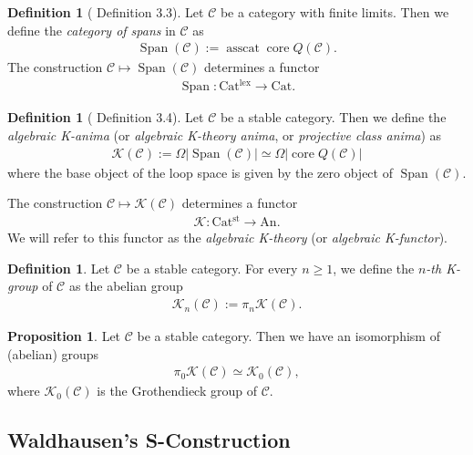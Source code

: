 \documentclass[a4paper,dvipdfmx,11pt,reqno]{amsart}
\newcommand{\C}{\mathcal{C}}
\newcommand{\K}{\mathcal{K}}
\DeclareMathOperator{\core}{core}
\DeclareMathOperator{\asscat}{asscat}
\DeclareMathOperator{\Span}{Span}
\newcommand{\An}{\mathrm{An}}
\newcommand{\Cat}{\mathrm{Cat}}
\newcommand{\Catlex}{\mathrm{Cat^{lex}}}
\newcommand{\Catst}{\mathrm{Cat^{st}}}
\theoremstyle{definition}
\newtheorem{definition}[theorem]{Definition}
\newtheorem{proposition}[theorem]{Proposition}
\begin{document}
\begin{definition}[\cite{HLS23} Definition 3.3] \label{HLS23.def.3.3}
  Let $\C$ be a category with finite limits.
  Then we define the \textit{category of spans} in $\C$ as 
  \begin{align*}
    \Span(\C) := \asscat \core Q(\C).
  \end{align*}
  The construction $\C \mapsto \Span(\C)$ determines a functor 
  \begin{align*}
    \Span : \Catlex \to \Cat.
  \end{align*}
\end{definition}

\begin{definition}[\cite{HLS23} Definition 3.4] \label{HLS23.def.3.4}
  Let $\C$ be a stable category.
  Then we define the \textit{algebraic K-anima} (or \textit{algebraic K-theory anima}, or \textit{projective class anima}) as 
  \begin{align*}
    \K(\C) := \Omega|\Span(\C)| \simeq \Omega|\core Q(\C)|
  \end{align*}
  where the base object of the loop space is given by the zero object of $\Span(\C)$.

  The construction $\C \mapsto \K(\C)$ determines a functor 
  \begin{align*}
    \K : \Catst \to \An. 
  \end{align*}
  We will refer to this functor as the \textit{algebraic K-theory} (or \textit{algebraic K-functor}).
\end{definition}

\begin{definition}
  Let $\C$ be a stable category.
  For every $n \geq 1$, we define the \textit{$n$-th K-group} of $\C$ as the abelian group 
  \begin{align*}
    \K_n(\C) := \pi_n\K(\C).
  \end{align*}
\end{definition}

\begin{proposition}
  Let $\C$ be a stable category.
  Then we have an isomorphism of (abelian) groups
  \begin{align*}
    \pi_0\K(\C) \simeq \K_0(\C),
  \end{align*}
  where $\K_0(\C)$ is the Grothendieck group of $\C$.
\end{proposition}

\subsection{Waldhausen's S-Construction}
\end{document}
